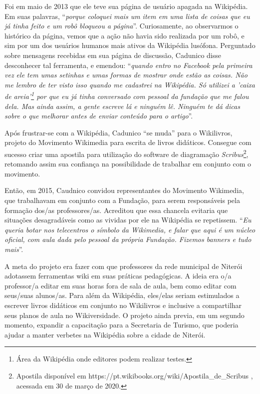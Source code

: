 Foi em maio de 2013 que ele teve sua página de usuário apagada na Wikipédia. Em suas palavras, ``\textit{porque coloquei mais um item em uma lista de coisas que eu já tinha feito e um robô bloqueou a página}''. Curiosamente, ao observarmos o histórico da página, vemos que a ação não havia sido realizada por um robô, e sim por um dos usuários humanos mais ativos da Wikipédia lusófona. Perguntado sobre mensagens recebidas em sua página de discussão, Cadunico disse desconhecer tal ferramenta, e emendou: ``\textit{quando entro no Facebook pela primeira vez ele tem umas setinhas e umas formas de mostrar onde estão as coisas. Não me lembro de ter visto isso quando me cadastrei na Wikipédia. Só utilizei a 'caixa de areia'\footnote{Área da Wikipédia onde editores podem realizar testes.} por que eu já tinha conversado com pessoal da fundação que me falou dela. Mas ainda assim, a gente escreve lá e ninguém lê. Ninguém te dá dicas sobre o que melhorar antes de enviar conteúdo para o artigo}''.

Após frustrar-se com a Wikipédia, Cadunico ``se muda'' para o Wikilivros, projeto do Movimento Wikimedia para escrita de livros didáticos. Consegue com sucesso criar uma apostila para utilização do software de diagramação \textit{Scribus}\footnote{Apostila disponível em  https://pt.wikibooks.org/wiki/Apostila\_de\_Scribus , acessada em 30 de março de 2020.}, retomando assim sua confiança na possibilidade de trabalhar em conjunto com o movimento.

Então, em 2015, Caudnico convidou representantes do Movimento Wikimedia, que trabalhavam em conjunto com a Fundação, para serem responsáveis pela formação dos/as professores/as. Acreditou que essa chancela evitaria que situações desagradáveis como as vividas por ele na Wikipédia se repetissem. ``\textit{Eu queria botar nos telecentros o símbolo da Wikimedia, e falar que aqui é um núcleo oficial, com aula dada pelo pessoal da própria Fundação. Fizemos banners e tudo mais}''.

A meta do projeto era fazer com que professores da rede municipal de Niterói adotassem ferramentas wiki em suas práticas pedagógicas. A ideia era o/a professor/a editar em suas horas fora de sala de aula, bem como editar com seus/suas alunos/as. Para além da Wikipédia, eles/elas seriam estimulados a escrever livros didáticos em conjunto no Wikilivros e inclusive a compartilhar seus planos de aula no Wikiversidade. O projeto ainda previa, em um segundo momento, expandir a capacitação para a Secretaria de Turismo, que poderia ajudar a manter verbetes na Wikipédia sobre a cidade de Niterói.

